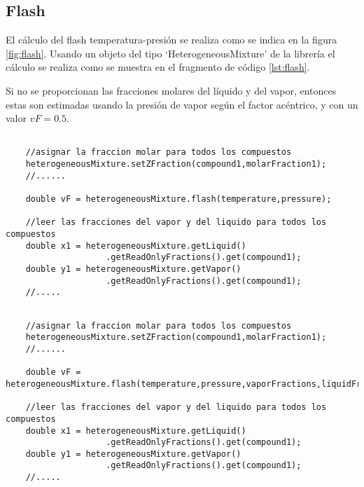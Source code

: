 \subsection{Flash}\label{subsec:flash}


	El cálculo del flash temperatura-presión se realiza como se indica en la figura \ref{fig:flash}. Usando un objeto del tipo `HeterogeneousMixture' de la librería \Materia el cálculo se realiza como se muestra en el fragmento de código \ref{lst:flash}.

	Si no se proporcionan las fracciones molares del líquido y del vapor, entonces estas son estimadas usando la presión de vapor según el factor acéntrico, y con un valor $vF = 0.5$.

\begin{lstlisting}[label={lst:flash},caption={Cálculo del flash temperatura-presión.}]

	//asignar la fraccion molar para todos los compuestos
	heterogeneousMixture.setZFraction(compound1,molarFraction1);
	//...... 

	double vF = heterogeneousMixture.flash(temperature,pressure);

	//leer las fracciones del vapor y del liquido para todos los compuestos
	double x1 = heterogeneousMixture.getLiquid()
					.getReadOnlyFractions().get(compound1);
	double y1 = heterogeneousMixture.getVapor()
					.getReadOnlyFractions().get(compound1);
	//.....
\end{lstlisting}

\begin{lstlisting}[label={lst:flashWithEstimate},caption={Cálculo del flash temperatura-presión proporcionando estimados iniciales}]

	//asignar la fraccion molar para todos los compuestos
	heterogeneousMixture.setZFraction(compound1,molarFraction1);
	//...... 

	double vF = heterogeneousMixture.flash(temperature,pressure,vaporFractions,liquidFractions,vF);

	//leer las fracciones del vapor y del liquido para todos los compuestos
	double x1 = heterogeneousMixture.getLiquid()
					.getReadOnlyFractions().get(compound1);
	double y1 = heterogeneousMixture.getVapor()
					.getReadOnlyFractions().get(compound1);
	//.....
\end{lstlisting}
